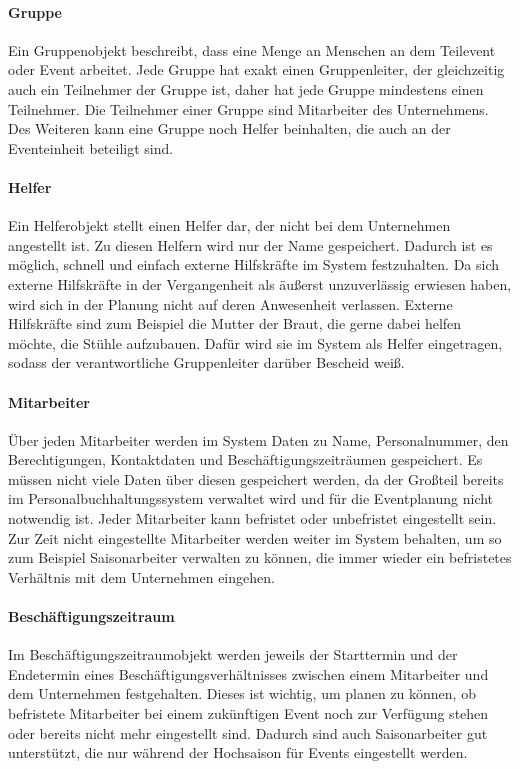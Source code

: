 \paragraph{Gruppe}
Ein Gruppenobjekt beschreibt, dass eine Menge an Menschen an dem Teilevent oder Event arbeitet. Jede Gruppe hat exakt einen Gruppenleiter, der gleichzeitig auch ein Teilnehmer der Gruppe ist, daher hat jede Gruppe mindestens einen Teilnehmer. Die Teilnehmer einer Gruppe sind Mitarbeiter des Unternehmens. Des Weiteren kann eine Gruppe noch Helfer beinhalten, die auch an der Eventeinheit beteiligt sind.
\paragraph{Helfer}
Ein Helferobjekt stellt einen Helfer dar, der nicht bei dem Unternehmen angestellt ist. Zu diesen Helfern wird nur der Name gespeichert. Dadurch ist es möglich, schnell und einfach externe Hilfskräfte im System festzuhalten. Da sich externe Hilfskräfte in der Vergangenheit als äußerst unzuverlässig erwiesen haben, wird sich in der Planung nicht auf deren Anwesenheit verlassen. Externe Hilfskräfte sind zum Beispiel die Mutter der Braut, die gerne dabei helfen möchte, die Stühle aufzubauen. Dafür wird sie im System als Helfer eingetragen, sodass der verantwortliche Gruppenleiter darüber Bescheid weiß.
\paragraph{Mitarbeiter}
Über jeden Mitarbeiter werden im System Daten zu Name, Personalnummer, den Berechtigungen, Kontaktdaten und Beschäftigungszeiträumen gespeichert. Es müssen nicht viele Daten über diesen gespeichert werden, da der Großteil bereits im Personalbuchhaltungssystem verwaltet wird und für die Eventplanung nicht notwendig ist. Jeder Mitarbeiter kann befristet oder unbefristet eingestellt sein. Zur Zeit nicht eingestellte Mitarbeiter werden weiter im System behalten, um so zum Beispiel Saisonarbeiter verwalten zu können, die immer wieder ein befristetes Verhältnis mit dem Unternehmen eingehen.
\paragraph{Beschäftigungszeitraum}
Im Beschäftigungszeitraumobjekt werden jeweils der Starttermin und der Endetermin eines Beschäftigungsverhältnisses zwischen einem Mitarbeiter und dem Unternehmen festgehalten. Dieses ist wichtig, um planen zu können, ob befristete Mitarbeiter bei einem zukünftigen Event noch zur Verfügung stehen oder bereits nicht mehr eingestellt sind. Dadurch sind auch Saisonarbeiter gut unterstützt, die nur während der Hochsaison für Events eingestellt werden.
